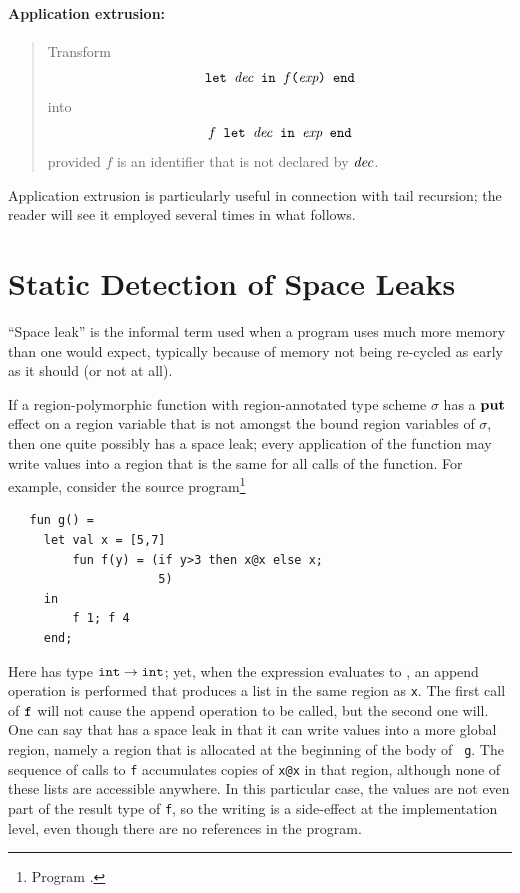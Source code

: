 \documentclass[12pt]{book}
\begin{document}
\subsubsection*{Application extrusion:}
\begin{quote}
%
Transform
$$\hbox{\tt let ${\it dec}$ in $f$($\hbox{\it exp}$) end}$$
into
$$\hbox{\tt $f$ let ${\it dec}$ in $\hbox{\it exp}$ end}$$
provided $f$ is an identifier that is not declared by ${\it dec}$.
\end{quote}

Application extrusion is particularly useful
in connection with 
%
tail recursion; the reader will see it employed several times in what
follows.
%

\chapter{Static Detection of Space Leaks}
\label{spaceleak.sec}

``Space leak'' is the informal term used when a program uses much more
memory than one would expect, typically because of memory not being
re-cycled as early as it should (or not at all).

If a region-polymorphic function with region-annotated type scheme
$\sigma$ has a $\mathop{\bf put}\nolimits$ effect on a region variable that is not amongst the
bound region variables of $\sigma$, then one quite possibly has a
space leak; every application of the function may write values into a
region that is the same for all calls of the function. For example,
consider the source program\footnote{Program
  .}
\begin{verbatim}
   fun g() = 
     let val x = [5,7]
         fun f(y) = (if y>3 then x@x else x; 
                     5)
     in 
         f 1; f 4
     end;
\end{verbatim} 
Here  has type $\hbox{\tt int}\to\hbox{\tt int}$; yet, when the
expression  evaluates to , an append operation
is performed that produces a list in the same region as {\tt x}. The
first call of $\hbox{\tt f}$ will not cause the append operation to be
called, but the second one will. One can say that  has a
space leak in that it can write values into a more global region,
namely a region that is allocated at the beginning of the body of {\tt
  g}. The sequence of calls to {\tt f} accumulates copies of {\tt x@x}
in that region, although none of these lists are accessible anywhere.
In this particular case, the values are not even part of the result
type of {\tt f}, so the writing is a side-effect at the implementation
level, even though there are no references in the program.
\end{document}
